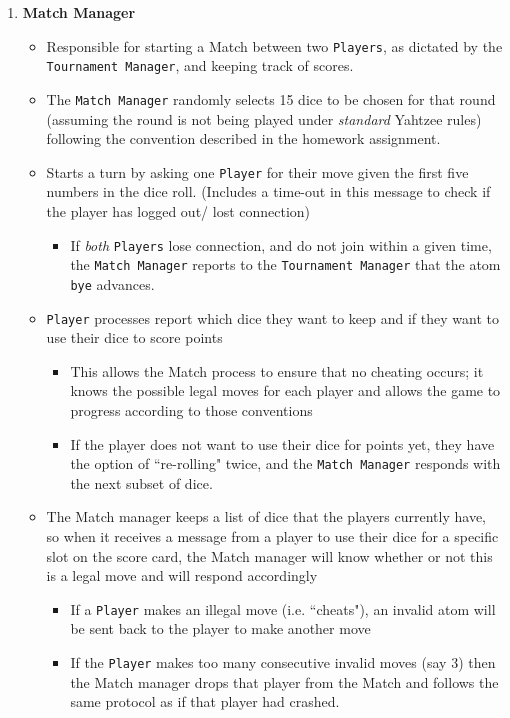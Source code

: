 \documentclass[12pt]{article}
\begin{document}
\begin{enumerate}
\item \textbf{Match Manager}
\begin{itemize} 
	\item Responsible for starting a Match between two \texttt{Players}, as dictated by the \texttt{Tournament Manager}, and keeping track of scores.
	\item The \texttt{Match Manager} randomly selects 15 dice to be chosen for that round (assuming the round is not being played under \emph{standard} Yahtzee rules) following the convention described in the homework assignment.
	\item Starts a turn by asking one \texttt{Player} for their move given the first five numbers in the dice roll. (Includes a time-out in this message to check if the player has logged out/ lost connection)
	\begin{itemize}
		\item If \emph{both} \texttt{Players} lose connection, and do not join within a given time, the \texttt{Match Manager} reports to the \texttt{Tournament Manager} that the atom \texttt{bye} advances.
	\end{itemize}
	\item \texttt{Player} processes report which dice they want to keep and if they want to use their dice to score points
	\begin{itemize}
		\item This allows the Match process to ensure that no cheating occurs; it knows the possible legal moves for each player and allows the game to progress according to those conventions
		\item If the player does not want to use their dice for points yet, they have the option of ``re-rolling" twice, and the \texttt{Match Manager} responds with the next subset of dice.
	\end{itemize}
	\item The Match manager keeps a list of dice that the players currently have, so when it receives a message from a player to use their dice for a specific slot on the score card, the Match manager will know whether or not this is a legal move and will respond accordingly
	\begin{itemize}
		\item If a \texttt{Player} makes an illegal move (i.e. ``cheats"), an invalid atom will be sent back to the player to make another move
		\item If the \texttt{Player} makes too many consecutive invalid moves (say 3) then the Match manager drops that player from the Match and follows the same protocol as if that player had crashed.

\end{itemize}
\end{itemize}
\end{enumerate}
\end{document}
